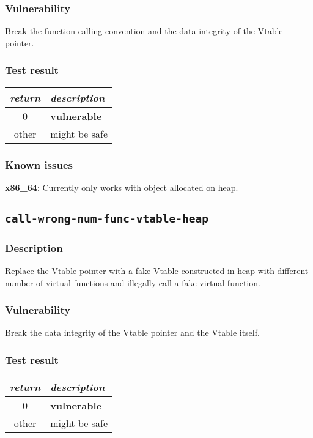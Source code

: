 \documentclass[a4paper]{book}
\begin{document}
\subsubsection{Vulnerability}
Break the function calling convention and the data integrity of the Vtable pointer.

\subsubsection{Test result}
\begin{tabular}{cl}
  \toprule
  \emph{return}  & \emph{description} \\
  \midrule
  0              & \textbf{vulnerable} \\
  other          & might be safe \\
  \bottomrule
\end{tabular}

\subsubsection{Known issues}

\textbf{x86\_64}: Currently only works with object allocated on heap.


\newpage
\subsection{\texttt{call-wrong-num-func-vtable-heap}}\label{test-call-wrong-num-func-vtable-heap}

\subsubsection{Description}
Replace the Vtable pointer with a fake Vtable constructed in heap with different number of virtual functions and
illegally call a fake virtual function.

\subsubsection{Vulnerability}
Break the data integrity of the Vtable pointer and the Vtable itself.

\subsubsection{Test result}
\begin{tabular}{cl}
  \toprule
  \emph{return}  & \emph{description} \\
  \midrule
  0              & \textbf{vulnerable} \\
  other          & might be safe \\
  \bottomrule
\end{tabular}
\end{document}
